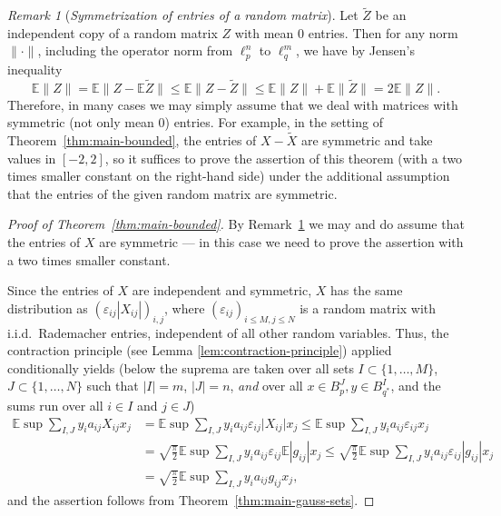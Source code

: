 \documentclass[a4paper]{amsart}
\theoremstyle{definition}
\theoremstyle{remark}
\newtheorem{remark}[theorem]{Remark}
\numberwithin{equation}{section}
\newcommand*{\EE}{\mathbb{E}}
\begin{document}
	\begin{remark}[\textit{Symmetrization of  entries of a random matrix}]
	\label{rmk:symmetrization}
		Let $\widetilde{Z}$ be an independent copy of a random matrix $Z$ with mean $0$ entries. Then for any norm $\|\cdot\|$,
		 including the operator norm from $\ell_p^n$ to $\ell_q^m$, 
		 we have by Jensen's inequality	
		\[
			\EE\|Z\| = \EE\| Z-\EE \widetilde{Z}\| \le  \EE\|Z-\widetilde{Z}\| \le \EE\|Z\|+\EE\|\widetilde{Z}\| =2\EE\|Z\|.
		\]
		Therefore, in many cases we may simply assume that we deal with matrices with symmetric (not only mean $0$) entries. For example, in the setting of Theorem~\ref{thm:main-bounded}, the entries of $X-\widetilde{X}$ are symmetric and take values in $[-2,2]$, so it suffices to prove the assertion of this theorem 
		(with a two times smaller constant on the right-hand side) under the additional assumption that the entries of the given random matrix are symmetric.
	\end{remark}


\begin{proof}[Proof of Theorem~\ref{thm:main-bounded}]
By Remark~\ref{rmk:symmetrization} we may and do assume that the entries of $X$ are symmetric --- in this case we need to prove the assertion with a  two times smaller constant.


Since the entries of $X$ are independent and symmetric, $X$ has the same distribution as $(\varepsilon_{ij}|X_{ij}|)_{i,j}$, where $(\varepsilon_{ij})_{i\leq M, j\leq N}$ is a random matrix with i.i.d.\  Rademacher entries, independent of all other random variables.
Thus, the contraction principle
(see Lemma \ref{lem:contraction-principle}) applied conditionally
 yields (below the suprema are taken over all sets $I\subset \{1,\ldots,M\}$, $J\subset \{1,\ldots,N\}$ such that $|I|=m$, $|J|=n$, \emph{and} over all $x\in B_p^ {J}, y\in B_{q^*}^ {I}$, and the sums run over all $i\in I$ and $j\in J$)
	\begin{align*}
		\EE \sup \sum_{I,J} y_ia_{ij} X_{ij} x_j
		& =  \EE \sup \sum_{I,J} y_ia_{ij} \varepsilon_{ij}\bigl|X_{ij} \bigr| x_j \leq \EE \sup \sum_{I,J} y_ia_{ij} \varepsilon_{ij}x_j
		\\
		& = \sqrt{\frac {\pi} 2} \EE \sup \sum_{I,J} y_ia_{ij} \varepsilon_{ij} \EE |g_{ij}|x_j \leq \sqrt{\frac {\pi} 2} \EE \sup \sum_{I,J} y_ia_{ij} \varepsilon_{ij} |g_{ij}|x_j
		\\
		& =  \sqrt{\frac {\pi} 2} \EE \sup \sum_{I,J} y_ia_{ij} g_{ij}x_j,
	\end{align*}
	and the assertion follows from Theorem~\ref{thm:main-gauss-sets}.
\end{proof}
\end{document}
